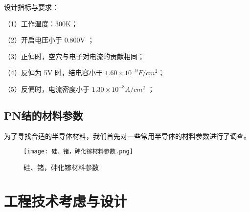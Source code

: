 \documentclass{zjureport}
\begin{document}
设计指标与要求：

（1）工作温度：300K；

（2）开启电压小于 0.800V ；

（3）正偏时，空穴与电子对电流的贡献相同；

（4）反偏为 5V 时，结电容小于 $ 1.60×10^{-9}F/cm^2$；

（5）反偏时，电流密度小于 $1.30×10^{-8}A/cm^2$
；
\subsection{PN结的材料参数}
为了寻找合适的半导体材料，我们首先对一些常用半导体的材料参数进行了调查。
 \begin{figure}[H] 
	     \centering 
	     \texttt{[image: 硅、锗，砷化镓材料参数.png]}
	     \caption{硅、锗，砷化镓材料参数} 
	 \end{figure}
	 
\begin{table}
	
\end{table}
\section{工程技术考虑与设计}
\subsection{}


% 
\end{document}
